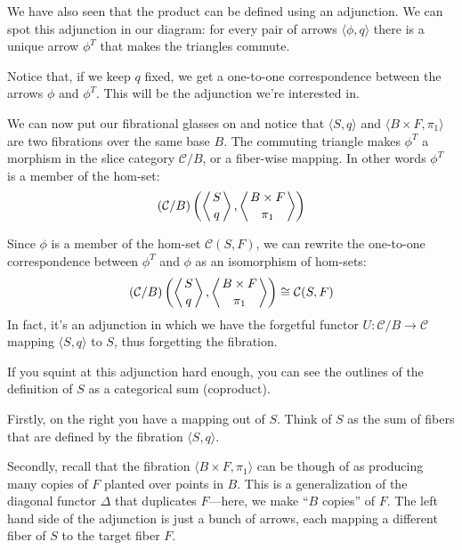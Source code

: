 \documentclass[DaoFP]{subfiles}
\begin{document}
We have also seen that the product can be defined using an adjunction. We can spot this adjunction in our diagram: for every pair of arrows $\langle \phi, q \rangle$ there is a unique arrow $\phi^T$ that makes the triangles commute. 

Notice that, if we keep $q$ fixed, we get a one-to-one correspondence between the arrows $\phi$ and $\phi^T$. This will be the adjunction we're interested in.

We can now put our fibrational glasses on and notice that $\langle S, q\rangle$ and $\langle B \times F, \pi_1 \rangle$ are two fibrations over the same base $B$. The commuting triangle makes $\phi^T$ a morphism in the slice category $\mathcal{C}/B$, or a fiber-wise mapping. In other words $\phi^T$ is a member of the hom-set:
 \[ (\mathcal{C}/B) \left(\left \langle {S \atop q} \right \rangle, \left \langle {B \times F \atop \pi_1} \right \rangle \right)  \]
 
 Since $\phi$ is a member of the hom-set $ \mathcal{C}(S, F)$, we can rewrite the one-to-one correspondence between $\phi^T$ and  $\phi$ as an isomorphism of hom-sets:
\[  (\mathcal{C}/B)\left(\left \langle {S \atop q} \right \rangle, \left \langle {B \times F \atop \pi_1} \right \rangle \right) \cong \mathcal{C}(S, F) \]
In fact, it's an adjunction in which we have the forgetful functor $U \colon \mathcal{C}/B \to \mathcal{C}$ mapping $\langle S, q \rangle$ to $S$, thus forgetting the fibration.

If you squint at this adjunction hard enough, you can see the outlines of the definition of $S$ as a categorical sum (coproduct). 

Firstly, on the right you have a mapping out of $S$. Think of $S$ as the sum of fibers that are defined by the fibration $\langle S, q \rangle$. 

Secondly, recall that the fibration $\langle B \times F, \pi_1 \rangle$ can be though of as producing many copies of $F$ planted over points in $B$. This is a generalization of the diagonal functor $\Delta$ that duplicates $F$---here, we make ``$B$ copies'' of $F$. The left hand side of the adjunction is just a bunch of arrows, each mapping a different fiber of $S$ to the target fiber $F$. 
\end{document}
